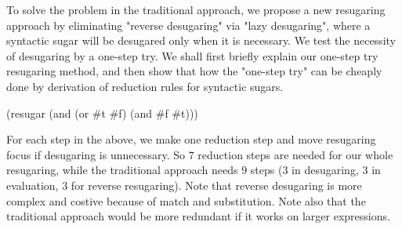 To solve the problem in the traditional approach, we propose a new resugaring approach by eliminating "reverse desugaring" via "lazy desugaring", where a syntactic sugar will be desugared only when it is necessary. We test the necessity of desugaring by a one-step try. We shall first briefly explain our one-step try resugaring method, and then show that how the "one-step try" can be cheaply done by derivation of reduction rules for syntactic sugars.

\begin{Codes}
    (resugar (and (or \#t \#f) (and \#f \#t)))
 
 
\end{Codes}

For each step in the above, we make one reduction step and move resugaring focus if desugaring is unnecessary. So $7$ reduction steps are needed for our whole resugaring, while the traditional approach needs $9$ steps ($3$ in desugaring, $3$ in evaluation, $3$ for reverse resugaring). Note that reverse desugaring is more complex and costive because of match and substitution. Note also that the traditional approach would be more redundant if it works on larger expressions.

